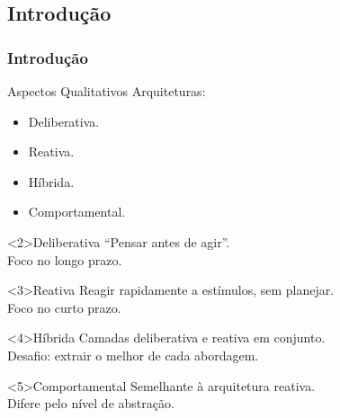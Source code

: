 \documentclass[hyperref={pdfpagelabels=false},table]{beamer}
\begin{document}
\subsection{Introdução}
\begin{frame}
	\frametitle{Introdução}
	\begin{block}{Aspectos Qualitativos}
		Arquiteturas:
		\begin{itemize}
		  \item<1,2> Deliberativa.
		  \item<1,3> Reativa.
		  \item<1,4> Híbrida.
		  \item<1,5> Comportamental.
		\end{itemize}
	\end{block}
	
	\begin{overprint}
	\begin{exampleblock}{Deliberativa}
		``Pensar antes de agir''.\\
		Foco no longo prazo.
	\end{exampleblock}
	\begin{exampleblock}{Reativa}
		Reagir rapidamente a estímulos, sem planejar.\\
		Foco no curto prazo.
	\end{exampleblock}
	\begin{exampleblock}{Híbrida}
		Camadas deliberativa e reativa em conjunto.\\
		Desafio: extrair o melhor de cada abordagem.
	\end{exampleblock}
	\begin{exampleblock}{Comportamental}
		Semelhante à arquitetura reativa. \\
		Difere pelo nível de abstração.
	\end{exampleblock}
	\end{overprint}
\end{frame}
\end{document}
